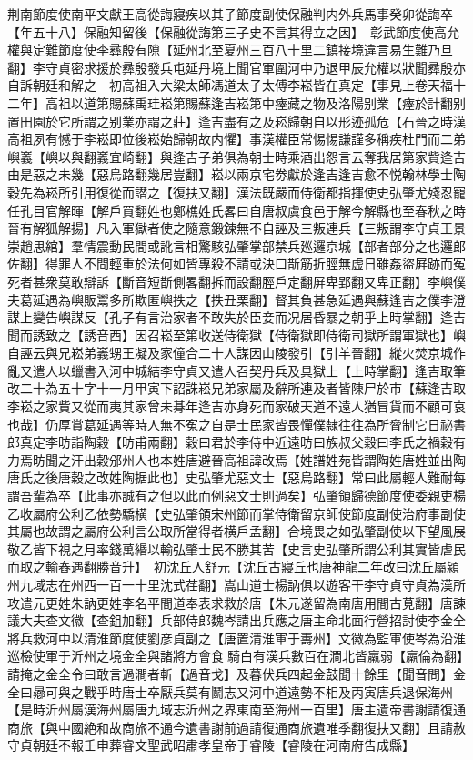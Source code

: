 荆南節度使南平文獻王高從誨寢疾以其子節度副使保融判内外兵馬事癸卯從誨卒【年五十八】保融知留後【保融從誨第三子史不言其得立之因】　彰武節度使高允權與定難節度使李彞殷有隙【延州北至夏州三百八十里二鎮接境違言易生難乃旦翻】李守貞密求援於彞殷發兵屯延丹境上聞官軍圍河中乃退甲辰允權以狀聞彞殷亦自訴朝廷和解之　初高祖入大梁太師馮道太子太傅李崧皆在真定【事見上卷天福十二年】高祖以道第賜蘇禹珪崧第賜蘇逢吉崧第中瘞藏之物及洛陽别業【瘞於計翻别置田園於它所謂之别業亦謂之莊】逢吉盡有之及崧歸朝自以形迹孤危【石晉之時漢高祖夙有憾于李崧即位後崧始歸朝故内懼】事漢權臣常惕惕謙謹多稱疾杜門而二弟嶼㠖【嶼以與翻㠖宜崎翻】與逢吉子弟俱為朝士時乘酒出怨言云奪我居第家貲逢吉由是惡之未幾【惡烏路翻幾居豈翻】崧以兩京宅劵獻於逢吉逢吉愈不悦翰林學士陶穀先為崧所引用復從而譛之【復扶又翻】漢法既嚴而侍衛都指揮使史弘肇尤殘忍寵任孔目官解暉【解戶買翻姓也鄭樵姓氏畧曰自唐叔虞食邑于解今解縣也至春秋之時晉有解狐解揚】凡入軍獄者使之隨意鍛鍊無不自誣及三叛連兵【三叛謂李守貞王景崇趙思綰】羣情震動民間或訛言相驚駭弘肇掌部禁兵廵邏京城【部者部分之也邏郎佐翻】得罪人不問輕重於法何如皆專殺不請或決口斮筋折脛無虚日雖姦盜屛跡而寃死者甚衆莫敢辯訴【斷音短斮側畧翻拆而設翻脛戶定翻屏卑郢翻又卑正翻】李嶼僕夫葛延遇為嶼販鬻多所欺匿嶼抶之【抶丑栗翻】督其負甚急延遇與蘇逢吉之僕李澄謀上變告嶼謀反【孔子有言治家者不敢失於臣妾而况居昏暴之朝乎上時掌翻】逢吉聞而誘致之【誘音酉】因召崧至第收送侍衛獄【侍衛獄即侍衛司獄所謂軍獄也】嶼自誣云與兄崧弟㠖甥王凝及家僮合二十人謀因山陵發引【引羊晉翻】縱火焚京城作亂又遣人以蠟書入河中城結李守貞又遣人召契丹兵及具獄上【上時掌翻】逢吉取筆改二十為五十字十一月甲寅下詔誅崧兄弟家屬及辭所連及者皆陳尸於市【蘇逢吉取李崧之家貲又從而夷其家曾未朞年逢吉亦身死而家破天道不遠人猶冒貨而不顧可哀也哉】仍厚賞葛延遇等時人無不寃之自是士民家皆畏憚僕隸往往為所脅制它日祕書郎真定李昉詣陶穀【昉甫兩翻】穀曰君於李侍中近遠昉曰族叔父穀曰李氏之禍穀有力焉昉聞之汗出穀邠州人也本姓唐避晉高祖諱改焉【姓譜姓苑皆謂陶姓唐姓並出陶唐氏之後唐穀之改姓陶据此也】史弘肇尤惡文士【惡烏路翻】常曰此屬輕人難耐每謂吾輩為卒【此事亦誠有之但以此而例惡文士則過矣】弘肇領歸德節度使委親吏楊乙收屬府公利乙依勢驕横【史弘肇領宋州節而掌侍衛留京師使節度副使治府事副使其屬也故謂之屬府公利言公取所當得者横戶孟翻】合境畏之如弘肇副使以下望風展敬乙皆下視之月率錢萬緡以輸弘肇士民不勝其苦【史言史弘肇所謂公利其實皆虐民而取之輸舂遇翻勝音升】　初沈丘人舒元【沈丘古寢丘也唐神龍二年改曰沈丘屬潁州九域志在州西一百一十里沈式荏翻】嵩山道士楊訥俱以遊客干李守貞守貞為漢所攻遣元更姓朱訥更姓李名平間道奉表求救於唐【朱元遂留為南唐用間古莧翻】唐諫議大夫查文徽【查鉏加翻】兵部侍郎魏岑請出兵應之唐主命北面行營招討使李金全將兵救河中以清淮節度使劉彦貞副之【唐置清淮軍于夀州】文徽為監軍使岑為沿淮巡檢使軍于沂州之境金全與諸將方會食騎白有漢兵數百在澗北皆羸弱【羸倫為翻】請掩之金全令曰敢言過澗者斬【過音戈】及暮伏兵四起金鼓聞十餘里【聞音問】金全曰曏可與之戰乎時唐士卒厭兵莫有鬭志又河中道遠勢不相及丙寅唐兵退保海州【是時沂州屬漢海州屬唐九域志沂州之界東南至海州一百里】唐主遺帝書謝請復通商旅【與中國絶和故商旅不通今遺書謝前過請復通商旅遺唯季翻復扶又翻】且請赦守貞朝廷不報壬申葬睿文聖武昭肅孝皇帝于睿陵【睿陵在河南府告成縣】

